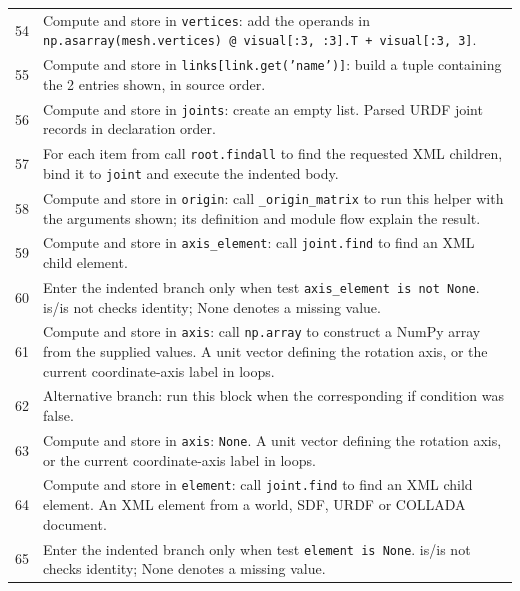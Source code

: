 \documentclass[11pt,a4paper]{book}
\begin{document}
\begin{longtable}{r p{}}
54 & Compute and store in \texttt{vertices}: add the operands in \texttt{np.asarray(mesh.vertices) @ visual[:3, :3].T + visual[:3, 3]}.  \\

55 & Compute and store in \texttt{links[link.get('name')]}: build a tuple containing the 2 entries shown, in source order.  \\

56 & Compute and store in \texttt{joints}: create an empty list. Parsed URDF joint records in declaration order. \\

57 & For each item from call \texttt{root.findall} to find the requested XML children, bind it to \texttt{joint} and execute the indented body. \\

58 & Compute and store in \texttt{origin}: call \texttt{\_origin\_matrix} to run this helper with the arguments shown; its definition and module flow explain the result.  \\

59 & Compute and store in \texttt{axis\_element}: call \texttt{joint.find} to find an XML child element.  \\

60 & Enter the indented branch only when test \texttt{axis\_element is not None}. is/is not checks identity; None denotes a missing value. \\

61 & Compute and store in \texttt{axis}: call \texttt{np.array} to construct a NumPy array from the supplied values. A unit vector defining the rotation axis, or the current coordinate-axis label in loops. \\

62 & Alternative branch: run this block when the corresponding if condition was false. \\

63 & Compute and store in \texttt{axis}: \texttt{None}. A unit vector defining the rotation axis, or the current coordinate-axis label in loops. \\

64 & Compute and store in \texttt{element}: call \texttt{joint.find} to find an XML child element. An XML element from a world, SDF, URDF or COLLADA document. \\

65 & Enter the indented branch only when test \texttt{element is None}. is/is not checks identity; None denotes a missing value. \\


\end{longtable}
\end{document}
